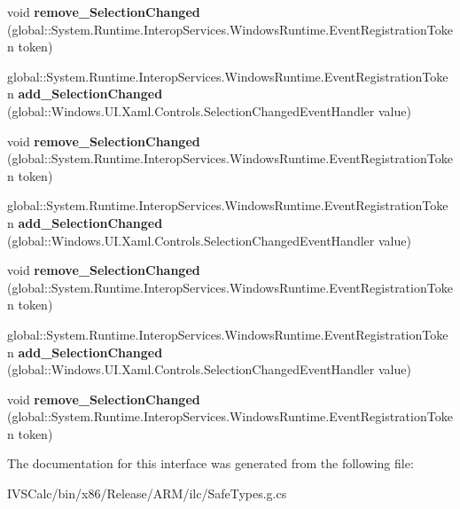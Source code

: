 \begin{DoxyCompactItemize}
void {\bfseries remove\+\_\+\+Selection\+Changed} (global\+::\+System.\+Runtime.\+Interop\+Services.\+Windows\+Runtime.\+Event\+Registration\+Token token)
\item 
\mbox{\label{interface_windows_1_1_u_i_1_1_xaml_1_1_controls_1_1_primitives_1_1_i_selector_ac3314f975ab7e2ffb6cd6d90c4000813}} 
global\+::\+System.\+Runtime.\+Interop\+Services.\+Windows\+Runtime.\+Event\+Registration\+Token {\bfseries add\+\_\+\+Selection\+Changed} (global\+::\+Windows.\+U\+I.\+Xaml.\+Controls.\+Selection\+Changed\+Event\+Handler value)
\item 
\mbox{\label{interface_windows_1_1_u_i_1_1_xaml_1_1_controls_1_1_primitives_1_1_i_selector_a5899b02dd76c1baceec6cafbaea9bd90}} 
void {\bfseries remove\+\_\+\+Selection\+Changed} (global\+::\+System.\+Runtime.\+Interop\+Services.\+Windows\+Runtime.\+Event\+Registration\+Token token)
\item 
\mbox{\label{interface_windows_1_1_u_i_1_1_xaml_1_1_controls_1_1_primitives_1_1_i_selector_ac3314f975ab7e2ffb6cd6d90c4000813}} 
global\+::\+System.\+Runtime.\+Interop\+Services.\+Windows\+Runtime.\+Event\+Registration\+Token {\bfseries add\+\_\+\+Selection\+Changed} (global\+::\+Windows.\+U\+I.\+Xaml.\+Controls.\+Selection\+Changed\+Event\+Handler value)
\item 
\mbox{\label{interface_windows_1_1_u_i_1_1_xaml_1_1_controls_1_1_primitives_1_1_i_selector_a5899b02dd76c1baceec6cafbaea9bd90}} 
void {\bfseries remove\+\_\+\+Selection\+Changed} (global\+::\+System.\+Runtime.\+Interop\+Services.\+Windows\+Runtime.\+Event\+Registration\+Token token)
\item 
\mbox{\label{interface_windows_1_1_u_i_1_1_xaml_1_1_controls_1_1_primitives_1_1_i_selector_ac3314f975ab7e2ffb6cd6d90c4000813}} 
global\+::\+System.\+Runtime.\+Interop\+Services.\+Windows\+Runtime.\+Event\+Registration\+Token {\bfseries add\+\_\+\+Selection\+Changed} (global\+::\+Windows.\+U\+I.\+Xaml.\+Controls.\+Selection\+Changed\+Event\+Handler value)
\item 
\mbox{\label{interface_windows_1_1_u_i_1_1_xaml_1_1_controls_1_1_primitives_1_1_i_selector_a5899b02dd76c1baceec6cafbaea9bd90}} 
void {\bfseries remove\+\_\+\+Selection\+Changed} (global\+::\+System.\+Runtime.\+Interop\+Services.\+Windows\+Runtime.\+Event\+Registration\+Token token)
\end{DoxyCompactItemize}


The documentation for this interface was generated from the following file\+:\begin{DoxyCompactItemize}
\item 
I\+V\+S\+Calc/bin/x86/\+Release/\+A\+R\+M/ilc/Safe\+Types.\+g.\+cs\end{DoxyCompactItemize}
